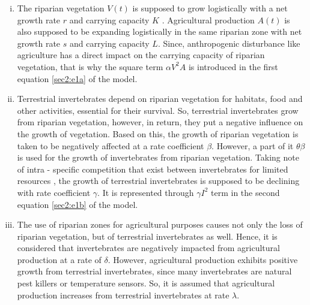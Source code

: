 \documentclass[12pt]{article}
\numberwithin{equation}{section}
\begin{document}
\begin{enumerate}[i).]
\item The riparian vegetation $V(t)$ is supposed to grow logistically  with a net growth rate $r$ and carrying capacity $K$ \cite{perucca2007}. Agricultural production $A(t)$ is also supposed to be expanding logistically in the same riparian zone with net growth rate $s$ and carrying capacity $L$. Since, anthropogenic disturbance like agriculture has a direct impact on the carrying capacity of riparian vegetation, that is why the square term $\alpha V^2 A$ is introduced in the first equation \eqref{sec2:e1a} of the model.
\item  Terrestrial invertebrates depend on riparian vegetation for habitats, food and other activities, essential for their survival. So, terrestrial invertebrates grow from riparian vegetation, however, in return, they put a negative influence on the growth of vegetation. Based on this, the growth of riparian vegetation is taken to be negatively affected at a rate coefficient $\beta$. However, a part of it $\theta \beta$ is used for the growth of invertebrates from riparian vegetation. Taking note of intra - specific competition that exist between invertebrates for limited resources \cite{ruetz2003interspecific}, the growth of terrestrial invertebrates is supposed to be declining with rate coefficient $\gamma$. It is represented through $\gamma I^2$ term in the second equation \eqref{sec2:e1b} of the model. 
\item The use of riparian zones for agricultural purposes causes  not only the loss of riparian vegetation, but of terrestrial invertebrates as well. Hence, it is considered that invertebrates are negatively impacted from agricultural production at a rate of $\delta$. However, agricultural production exhibits positive growth from terrestrial invertebrates, since many invertebrates are natural pest killers or temperature sensors. So, it is assumed that agricultural production increases from terrestrial invertebrates at rate $\lambda$. 
\end{enumerate}
\end{document}
